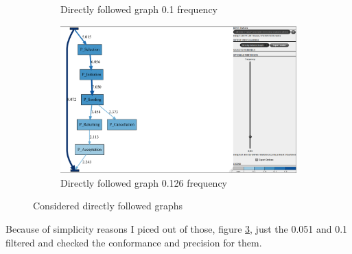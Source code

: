 \begin{figure}[!htbp]
\begin{subfigure}{.4\textwidth}
  \caption{Directly followed graph 0.1 frequency}
  \label{fig:P_DFG0-1}
\end{subfigure}
\begin{subfigure}{.4\textwidth}
  \centering
  \includegraphics[width=\linewidth]{P_DirectlyFollowedFreq0-126.PNG}
  \caption{Directly followed graph 0.126 frequency}
  \label{fig:P_DFG0-126}
\end{subfigure}
\caption{Considered directly followed graphs}
\label{fig:P_Direct}
\end{figure}

Because of simplicity reasons I piced out of those, figure \ref{fig:P_Direct}, just the 0.051 and 0.1 filtered and checked the conformance and precision for them. 


